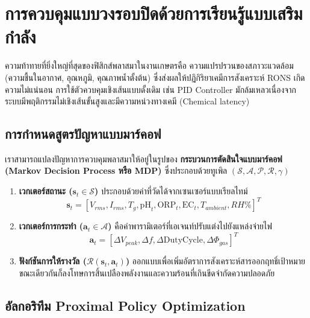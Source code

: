 \section{การควบคุมแบบวงรอบปิดด้วยการเรียนรู้แบบเสริมกำลัง}

ความท้าทายที่ยิ่งใหญ่ที่สุดของฟิสิกส์พลาสมาในงานเกษตรคือ ความแปรปรวนของสภาวะแวดล้อม (ความชื้นในอากาศ, อุณหภูมิ, คุณภาพน้ำตั้งต้น) ซึ่งส่งผลให้ปฏิกิริยาเคมีการสังเคราะห์ RONS เกิดความไม่แน่นอน การใช้ตัวควบคุมเชิงเส้นแบบดั้งเดิม เช่น PID Controller มักล้มเหลวเนื่องจากระบบมีพฤติกรรมไม่เชิงเส้นขั้นสูงและมีความหน่วงทางเคมี (Chemical latency)

\subsection{การกำหนดสูตรปัญหาแบบมาร์คอฟ}

เราสามารถแปลงปัญหาการควบคุมพลาสมาให้อยู่ในรูปของ \textbf{กระบวนการตัดสินใจแบบมาร์คอฟ (Markov Decision Process หรือ MDP)} ซึ่งประกอบด้วยทูเพิล $(\mathcal{S}, \mathcal{A}, \mathcal{P}, \mathcal{R}, \gamma)$
\begin{enumerate}
    \item \textbf{เวกเตอร์สถานะ ($\mathbf{s}_t \in \mathcal{S}$)} ประกอบด้วยค่าที่วัดได้จากเซนเซอร์แบบเรียลไทม์
    \begin{equation}
        \mathbf{s}_t = \left[ V_{rms}, I_{rms}, T_g, \text{pH}_t, \text{ORP}_t, \text{EC}_t, T_{ambient}, RH\% \right]^T
    \end{equation}
    \item \textbf{เวกเตอร์การกระทำ ($\mathbf{a}_t \in \mathcal{A}$)} คือค่าพารามิเตอร์ที่เอเจนท์ปรับแต่งไปยังแหล่งจ่ายไฟ
    \begin{equation}
        \mathbf{a}_t = \left[ \Delta V_{peak}, \Delta f, \Delta \text{DutyCycle}, \Delta \Phi_{gas} \right]^T
    \end{equation}
    \item \textbf{ฟังก์ชันการให้รางวัล ($\mathcal{R}(\mathbf{s}_t, \mathbf{a}_t)$)} ออกแบบเพื่อเพิ่มอัตราการสังเคราะห์สารออกฤทธิ์เป้าหมาย ขณะเดียวกันก็ลงโทษการสิ้นเปลืองพลังงานและความร้อนที่เกินขีดจำกัดความปลอดภัย
\end{enumerate}

\subsection{อัลกอริทึม Proximal Policy Optimization}

